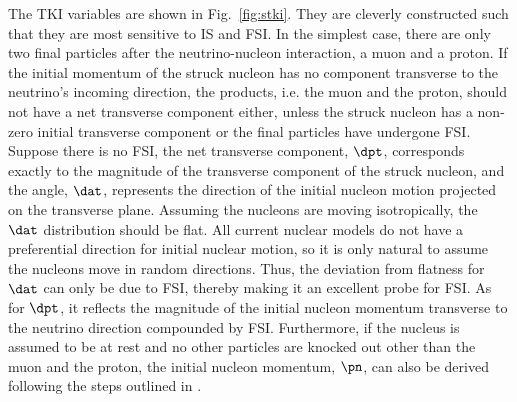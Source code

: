 The TKI variables are shown in Fig.~\ref{fig:stki}. They are cleverly constructed such that they are most sensitive to IS and FSI. 
In the simplest case, there are only two final particles after the neutrino-nucleon interaction, a muon and a proton. 
If the initial momentum of the struck nucleon has no component transverse to the neutrino's incoming direction, the products, i.e. the muon and the proton, should not have a net transverse component either, unless the struck nucleon has a non-zero initial transverse component or the final particles have undergone FSI.
Suppose there is no FSI, the net transverse component, $\dpt$, corresponds exactly to the magnitude of the transverse component of the struck nucleon, and the angle, $\dat$, represents the direction of the initial nucleon motion projected on the transverse plane. 
Assuming the nucleons are moving isotropically, the $\dat$ distribution should be flat. 
All current nuclear models do not have a preferential direction for initial nuclear motion, so it is only natural to assume the nucleons move in random directions. 
Thus, the deviation from flatness for $\dat$ can only be due to FSI, thereby making it an excellent probe for FSI. 
As for $\dpt$, it reflects the magnitude of the initial nucleon momentum transverse to the neutrino direction compounded by FSI. 
Furthermore, if the nucleus is assumed to be at rest and no other particles are knocked out other than the muon and the proton, the initial nucleon momentum, $\pn$, can also be derived following the steps outlined in \cite{pnpaper}. 
 